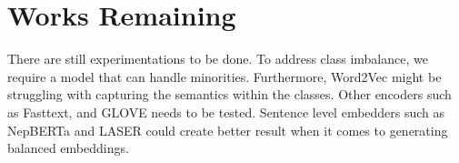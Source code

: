 \section{Works Remaining}
There are still experimentations to be done. To address class imbalance, we require a model that can handle minorities. Furthermore, Word2Vec might be struggling with capturing the semantics within the classes. Other encoders such as Fasttext, and GLOVE needs to be tested. Sentence level embedders such as NepBERTa and LASER could create better result when it comes to generating balanced embeddings.







\newpage
\renewcommand{\bibname}{REFERENCES} %








\nocite{goyal_2021}


